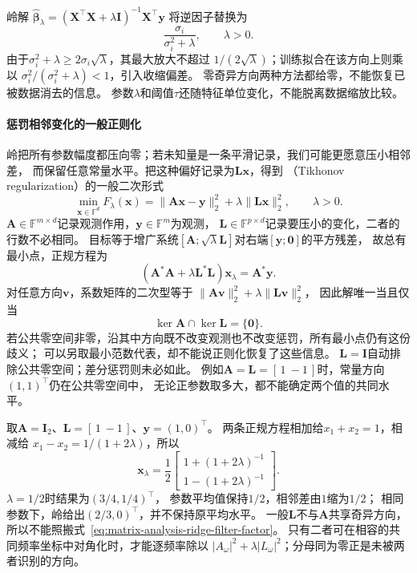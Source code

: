 岭解
$\widehat{\bm\beta}_\lambda
=(\bm X^\top\bm X+\lambda\bm I)^{-1}\bm X^\top\bm y$
将逆因子替换为
\begin{equation}
 \frac{\sigma_i}{\sigma_i^2+\lambda},\qquad \lambda>0.
 \label{eq:matrix-analysis-ridge-filter-factor}
\end{equation}
由于$\sigma_i^2+\lambda\geq2\sigma_i\sqrt\lambda$，其最大放大不超过
$1/(2\sqrt\lambda)$；训练拟合在该方向上则乘以
$\sigma_i^2/(\sigma_i^2+\lambda)<1$，引入收缩偏差。
零奇异方向两种方法都给零，不能恢复已被数据消去的信息。
参数$\lambda$和阈值$\tau$还随特征单位变化，不能脱离数据缩放比较。

\paragraph{惩罚相邻变化的一般正则化}
岭把所有参数幅度都压向零；若未知量是一条平滑记录，我们可能更愿意压小相邻差，
而保留任意常量水平。把这种偏好记录为$\bm L\bm x$，得到
（Tikhonov regularization）的一般二次形式
\begin{equation}
 \min_{\bm x\in\mathbb F^d}
 F_\lambda(\bm x)=\|\bm A\bm x-\bm y\|_2^2+\lambda\|\bm L\bm x\|_2^2,
 \qquad \lambda>0.
 \label{eq:linear-algebra-general-tikhonov}
\end{equation}
$\bm A\in\mathbb F^{m\times d}$记录观测作用，$\bm y\in\mathbb F^m$为观测，
$\bm L\in\mathbb F^{p\times d}$记录要压小的变化，二者的行数不必相同。
目标等于增广系统$[\bm A;\sqrt\lambda\bm L]$对右端$[\bm y;\bm0]$的平方残差，
故总有最小点，正规方程为
\[
 (\bm A^*\bm A+\lambda\bm L^*\bm L)\bm x_\lambda=\bm A^*\bm y.
\]
对任意方向$\bm v$，系数矩阵的二次型等于
$\|\bm A\bm v\|_2^2+\lambda\|\bm L\bm v\|_2^2$，
因此解唯一当且仅当
\begin{equation}
 \ker\bm A\cap\ker\bm L=\{\bm0\}.
 \label{eq:linear-algebra-tikhonov-common-nullspace}
\end{equation}
若公共零空间非零，沿其中方向既不改变观测也不改变惩罚，所有最小点仍有这份歧义；
可以另取最小范数代表，却不能说正则化恢复了这些信息。
$\bm L=\bm I$自动排除公共零空间；差分惩罚则未必如此。
例如$\bm A=\bm L=[\,1\ -1\,]$时，常量方向$(1,1)^\top$仍在公共零空间中，
无论正参数取多大，都不能确定两个值的共同水平。

取$\bm A=\bm I_2$、$\bm L=[\,1\ -1\,]$、$\bm y=(1,0)^\top$。
两条正规方程相加给$x_1+x_2=1$，相减给
$x_1-x_2=1/(1+2\lambda)$，所以
\[
 \bm x_\lambda=\frac12
 \begin{bmatrix}1+(1+2\lambda)^{-1}\\1-(1+2\lambda)^{-1}\end{bmatrix}.
\]
$\lambda=1/2$时结果为$(3/4,1/4)^\top$，
参数平均值保持$1/2$，相邻差由$1$缩为$1/2$；
相同参数下，岭给出$(2/3,0)^\top$，并不保持原平均水平。
一般$\bm L$不与$\bm A$共享奇异方向，
所以不能照搬式~\eqref{eq:matrix-analysis-ridge-filter-factor}。
只有二者可在相容的共同频率坐标中对角化时，才能逐频率除以
$|A_\omega|^2+\lambda|L_\omega|^2$；分母同为零正是未被两者识别的方向。

